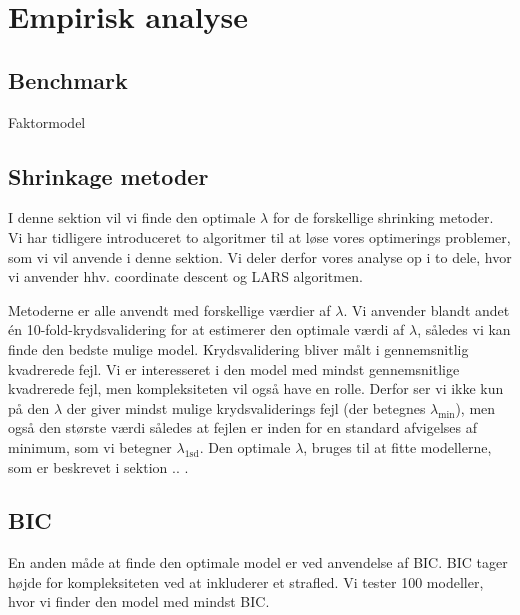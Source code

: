 \chapter{Empirisk analyse}
 
\section{Benchmark}
Faktormodel


\section{Shrinkage metoder}
I denne sektion vil vi finde den optimale $\lambda$ for de forskellige shrinking metoder. 
Vi har tidligere introduceret to algoritmer til at løse vores optimerings problemer, som vi vil anvende i denne sektion.
Vi deler derfor vores analyse op i to dele, hvor vi anvender hhv. coordinate descent og LARS algoritmen.

Metoderne er alle anvendt med forskellige værdier af $\lambda$. 
Vi anvender blandt andet én 10-fold-krydsvalidering for at estimerer den optimale værdi af $\lambda$, således vi kan finde den bedste mulige model. 
Krydsvalidering bliver målt i gennemsnitlig kvadrerede fejl. 
Vi er interesseret i den model med mindst gennemsnitlige kvadrerede fejl, men kompleksiteten vil også have en rolle.
Derfor ser vi ikke kun på den $\lambda$ der giver mindst mulige krydsvaliderings fejl (der betegnes $\lambda_{\min}$), men også den største værdi således at fejlen er inden for en standard afvigelses af minimum, som vi betegner $\lambda_{\text{1sd}}$.  
Den optimale $\lambda$, bruges til at fitte modellerne, som er beskrevet i sektion .. .  





\section{BIC}
En anden måde at finde den optimale model er ved anvendelse af BIC. 
BIC tager højde for kompleksiteten ved at inkluderer et strafled.
Vi tester 100 modeller, hvor vi finder den model med mindst BIC. 
